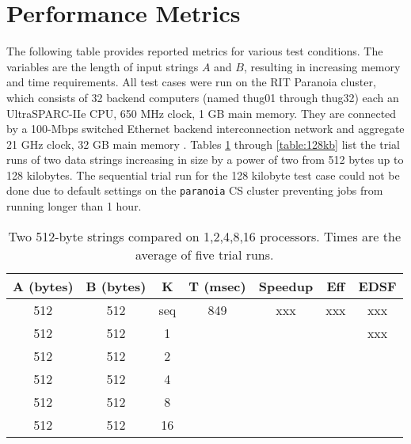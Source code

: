 \section{Performance Metrics}
\label{sec:metrics}
The following table provides reported metrics for various test conditions. The variables are the length of input strings $A$ and $B$, resulting in increasing memory and time requirements. All test cases were run on the RIT Paranoia cluster, which consists of 32 backend computers (named thug01 through thug32) each an UltraSPARC-IIe CPU, 650 MHz clock, 1 GB main memory. They are connected by a 100-Mbps switched Ethernet backend interconnection network and aggregate 21 GHz clock, 32 GB main memory \cite{running-pj}. Tables \ref{table:512b} through \ref{table:128kb} list the trial runs of two data strings increasing in size by a power of two from 512 bytes up to 128 kilobytes. The sequential trial run for the 128 kilobyte test case could not be done due to default settings on the {\tt paranoia} CS cluster preventing jobs from running longer than 1 hour.

\begin{table}[h]
	\begin{center}
		\begin{tabular}{ | c | c | c | c | c | c | c |}
			\hline
			A (bytes)&	B (bytes) &	K	&	T (msec)	&	Speedup	&	Eff	&	EDSF \\
			\hline																	 
			512     &	512     &	seq	&	849  		&	xxx		&	xxx	&	xxx  \\
			512     &	512     &	1	&		 	 	&			&		&	xxx \\
			512     &	512     &	2	&	 	 	 	&			&		&\\
			512     &	512     &	4	&	 	 	 	&			&		&\\
			512     &	512     &	8	&	 	 	 	&			&		&\\
			512     &	512     &	16	&				&	 	 	&		&\\
			\hline
		\end{tabular}
	\end{center}
	\caption{Two 512-byte strings compared on {1,2,4,8,16} processors. Times are the average of five trial runs.}
	\label{table:512b}
\end{table}

